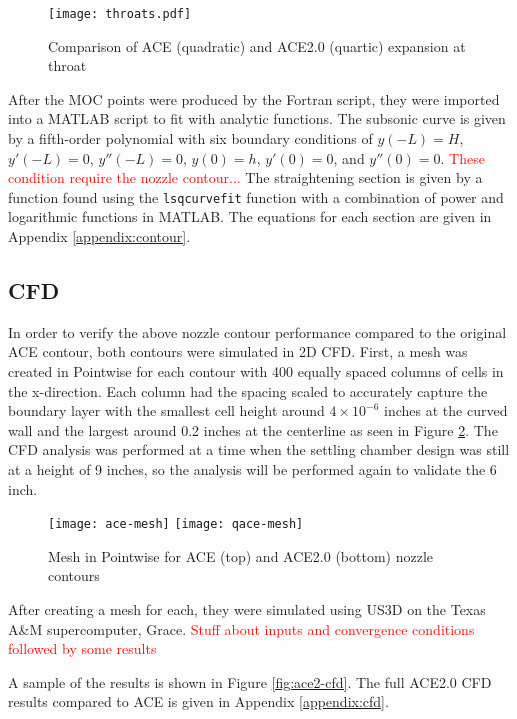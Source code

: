 \begin{figure}[ht!]
    \centering
    \texttt{[image: throats.pdf]}
    \caption{Comparison of ACE (quadratic) and ACE2.0 (quartic) expansion at throat}
    \label{fig:throats}
\end{figure}

After the MOC points were produced by the Fortran script, they were imported into a MATLAB script to fit with analytic functions. The subsonic curve is given by a fifth-order polynomial with six boundary conditions of $y(-L)=H$, $y'(-L)=0$, $y''(-L)=0$, $y(0)=h$, $y'(0)=0$, and $y''(0)=0$. \textcolor{red}{These condition require the nozzle contour...} The straightening section is given by a function found using the \texttt{lsqcurvefit} function with a combination of power and logarithmic functions in MATLAB. The equations for each section are given in Appendix \ref{appendix:contour}.

\subsection{CFD}

In order to verify the above nozzle contour performance compared to the original ACE contour, both contours were simulated in 2D CFD. First, a mesh was created in Pointwise for each contour with 400 equally spaced columns of cells in the x-direction. Each column had the spacing scaled to accurately capture the boundary layer with the smallest cell height around $4 \times 10^{-6}$ inches at the curved wall and the largest around 0.2 inches at the centerline as seen in Figure \ref{fig:mesh}. The CFD analysis was performed at a time when the settling chamber design was still at a height of 9 inches, so the analysis will be performed again to validate the 6 inch.

\begin{figure}[ht!]
    \centering
    \texttt{[image: ace-mesh]}
    \texttt{[image: qace-mesh]}
    \caption{Mesh in Pointwise for ACE (top) and ACE2.0 (bottom) nozzle contours}
    \label{fig:mesh}
\end{figure}

After creating a mesh for each, they were simulated using US3D on the Texas A\&M supercomputer, Grace. \textcolor{red}{Stuff about inputs and convergence conditions followed by some results} 

A sample of the results is shown in Figure \ref{fig:ace2-cfd}. The full ACE2.0 CFD results compared to ACE is given in Appendix \ref{appendix:cfd}.

